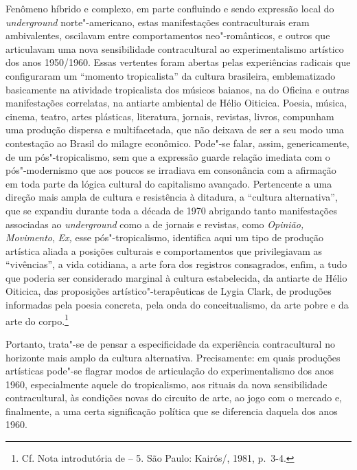 Fenômeno híbrido e complexo, em parte confluindo e sendo expressão local
do \emph{underground} norte"-americano, estas manifestações
contraculturais eram ambivalentes, oscilavam entre comportamentos
neo"-românticos, e outros que articulavam uma nova sensibilidade
contracultural ao experimentalismo artístico dos anos 1950/1960. Essas
vertentes foram abertas pelas experiências radicais que configuraram um
``momento tropicalista'' da cultura brasileira, emblematizado
basicamente na atividade tropicalista dos músicos baianos, na do Oficina
e outras manifestações correlatas, na antiarte ambiental de Hélio
Oiticica. Poesia, música, cinema, teatro, artes plásticas, literatura,
jornais, revistas, livros, compunham uma produção dispersa e
multifacetada, que não deixava de ser a seu modo uma contestação ao
Brasil do milagre econômico. Pode"-se falar, assim, genericamente, de um
pós"-tropicalismo, sem que a expressão guarde relação imediata com o
pós"-modernismo que aos poucos se irradiava em consonância com a
afirmação em toda parte da lógica cultural do capitalismo avançado.
Pertencente a uma direção mais ampla de cultura e resistência à
ditadura, a ``cultura alternativa'', que se expandiu durante toda a
década de 1970 abrigando tanto manifestações associadas ao
\emph{underground} como a de jornais e revistas, como \emph{Opinião,
Movimento}, \emph{Ex,} esse pós"-tropicalismo, identifica aqui um tipo de
produção artística aliada a posições culturais e comportamentos que
privilegiavam as ``vivências'', a vida cotidiana, a arte fora dos
registros consagrados, enfim, a tudo que poderia ser considerado
marginal à cultura estabelecida, da antiarte de Hélio Oiticica, das
proposições artístico"-terapêuticas de Lygia Clark, de produções
informadas pela poesia concreta, pela onda do conceitualismo, da arte
pobre e da arte do corpo.\footnote{Cf. Nota introdutória de {} -- 5. São Paulo: Kairós/\scalebox{0.8}{CEAC}, 1981, p.~3-4.}

Portanto, trata"-se de pensar a especificidade da experiência
contracultural no horizonte mais amplo da cultura alternativa.
Precisamente: em quais produções artísticas pode"-se flagrar modos de
articulação do experimentalismo dos anos 1960, especialmente aquele do
tropicalismo, aos rituais da nova sensibilidade contracultural, às
condições novas do circuito de arte, ao jogo com o mercado e,
finalmente, a uma certa significação política que se diferencia daquela
dos anos 1960.

